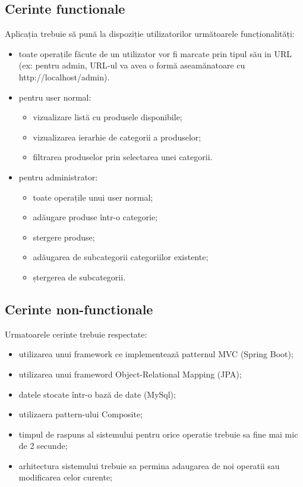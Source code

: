 \documentclass[11pt,a4paper,twoside,notitlepage]{article}
\begin{document}
\subsection{Cerinte functionale}
Aplicația trebuie să pună la dispoziție utilizatorilor următoarele funcționalități:
\begin{itemize}
	\item toate operațile făcute de un utilizator vor fi marcate prin tipul său in URL (ex: pentru admin, URL-ul va avea o formă aseamănatoare cu http://localhost/admin).
	\item pentru user normal:
					\begin{itemize}
						\item	vizualizare listă cu produsele disponibile;
						\item 	vizualizarea ierarhie de categorii a produselor;
						\item 	filtrarea produselor prin selectarea unei categorii.
					\end{itemize}
	\item pentru administrator:
					\begin{itemize}
						\item	toate operațile unui user normal;
						\item	adăugare produse într-o categorie;
						\item	stergere produse;
						\item	adăugarea de subcategorii categoriilor existente;
						\item 	ștergerea de subcategorii.
					\end{itemize}
\end{itemize}

\subsection{Cerinte non-functionale}
Urmatoarele cerinte trebuie respectate:
\begin{itemize}
	\item 	utilizarea unui framework ce implementează patternul MVC (Spring Boot);
	\item	utilizarea unui frameword Object-Relational Mapping (JPA);
	\item 	datele stocate într-o bază de date (MySql);
	\item 	utilizaera pattern-ului Composite;
	\item	timpul de raspuns al sistemului pentru orice operatie trebuie sa fine mai mic de 2 secunde;
	\item	arhitectura sistemului trebuie sa permina adaugarea de noi operatii sau modificarea celor curente;
\end{itemize}
\end{document}
